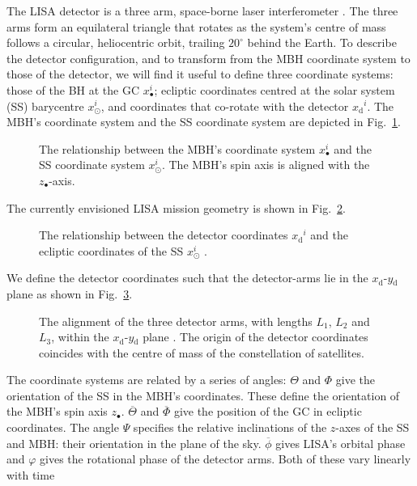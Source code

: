 \documentclass[useAMS,usedcolumn,usegraphicx,usenatbib]{mn2e}
\newcommand{\figref}[1]{Fig.~\ref{fig:#1}}
\newcommand{\sub}[1]{\ensuremath{_\mathrm{#1}}}
\begin{document}
The LISA detector is a three arm, space-borne laser interferometer \citep{Bender1998, Danzmann2003}. The three arms form an equilateral triangle that rotates as the system's centre of mass follows a circular, heliocentric orbit, trailing $20^{\circ}$ behind the Earth. To describe the detector configuration, and to transform from the MBH coordinate system to those of the detector, we will find it useful to define three coordinate systems: those of the BH at the GC $x_\bullet^i$; ecliptic coordinates centred at the solar system (SS) barycentre $x_\odot^i$, and coordinates that co-rotate with the detector $x\sub{d}^i$. The MBH's coordinate system and the SS coordinate system are depicted in \figref{BH_SS}.
\begin{figure}[tbhp]
\begin{center}
    \caption{The relationship between the MBH's coordinate system $x_\bullet^i$ and the SS coordinate system $x_\odot^i$. The MBH's spin axis is aligned with the $z_\bullet$-axis.}
   \label{fig:BH_SS}
\end{center}
\end{figure}
The currently envisioned LISA mission geometry is shown in \figref{SS_LISA}.
\begin{figure}
\begin{center}
    \caption{The relationship between the detector coordinates $x\sub{d}^i$ and the ecliptic coordinates of the SS $x_\odot^i$ \citep{Bender1998}.}
   \label{fig:SS_LISA}
\end{center}
\end{figure}
We define the detector coordinates such that the detector-arms lie in the $x\sub{d}$-$y\sub{d}$ plane as shown in \figref{LISA_arms}.
\begin{figure}
\begin{center}
    \caption{The alignment of the three detector arms, with lengths $L_1$, $L_2$ and $L_3$, within the $x\sub{d}$-$y\sub{d}$ plane \citep{Cutler1998}. The origin of the detector coordinates coincides with the centre of mass of the constellation of satellites.}
   \label{fig:LISA_arms}
\end{center}
\end{figure}
The coordinate systems are related by a series of angles: $\Theta$ and $\Phi$ give the orientation of the SS in the MBH's coordinates. These define the orientation of the MBH's spin axis $z_\bullet$. $\overline{\Theta}$ and $\overline{\Phi}$ give the position of the GC in ecliptic coordinates. The angle $\Psi$ specifies the relative inclinations of the $z$-axes of the SS and MBH: their orientation in the plane of the sky. $\overline{\phi}$ gives LISA's orbital phase and $\varphi$ gives the rotational phase of the detector arms. Both of these vary linearly with time
\end{document}
